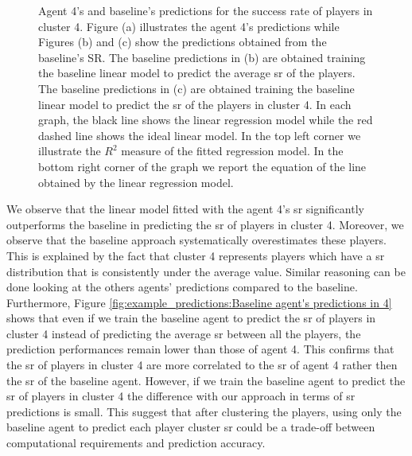 \begin{figure}[h]
    \caption{Agent 4's and baseline's predictions for the success rate of players in cluster 4. Figure (a) illustrates the agent 4's predictions while Figures (b) and (c) show the predictions obtained from the baseline's SR. The baseline predictions in (b) are obtained training the baseline linear model to predict the average \acs{sr} of the players. The baseline predictions in (c) are obtained training the baseline linear model to predict the \acs{sr} of the players in cluster 4. In each graph, the black line shows the linear regression model while the red dashed line shows the ideal linear model. In the top left corner we illustrate the $R^2$ measure of the fitted regression model. In the bottom right corner of the graph we report the equation of the line obtained by the linear regression model.}
    \label{fig:example_predictions}
\end{figure}
We observe that the linear model fitted with the agent 4's \acs{sr} significantly outperforms the baseline in predicting the \acs{sr} of players in cluster 4. Moreover, we observe that the baseline approach systematically overestimates these players. This is explained by the fact that cluster 4 represents players which have a \acs{sr} distribution that is consistently under the average value. Similar reasoning can be done looking at the others agents' predictions compared to the baseline. Furthermore, Figure \ref{fig:example_predictions:Baseline agent's predictions in 4} shows that even if we train the baseline agent to predict the \acs{sr} of players in cluster 4 instead of predicting the average \acs{sr} between all the players, the prediction performances remain lower than those of agent 4. This confirms that the \acs{sr} of players in cluster 4 are more correlated to the \acs{sr} of agent 4 rather then the \acs{sr} of the baseline agent. However, if we train the baseline agent to predict the \acs{sr} of players in cluster 4 the difference with our approach in terms of \acs{sr} predictions is small. This suggest that after clustering the players, using only the baseline agent to predict each player cluster \acs{sr} could be a trade-off between computational requirements and prediction accuracy. 

